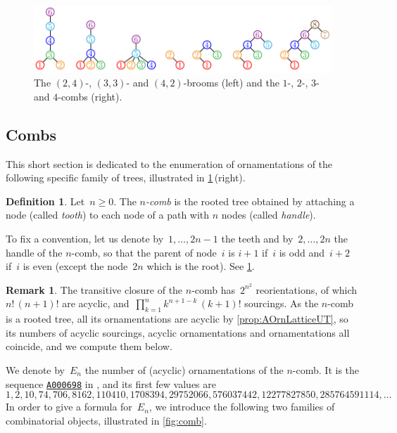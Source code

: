 \documentclass{amsart}
\theoremstyle{definition}
\newtheorem{definition}[theorem]{Definition}
\newtheorem{remark}[theorem]{Remark}
\newcommand{\darkblue}{\color{darkblue}} %
\newcommand{\defn}[1]{\textsl{\darkblue #1}} %
\newcommand{\OEIS}[1]{{\rm \href{http://oeis.org/#1}{\texttt{#1}}}}
\begin{document}
\begin{figure}
	\centerline{\includegraphics[scale=.8]{broomsCombs}}
	\caption{The $(2,4)$-, $(3,3)$- and $(4,2)$-brooms (left) and the $1$-, $2$-, $3$- and $4$-combs (right).}
	\label{fig:broomsCombs}
\end{figure}

\subsection{Combs}
\label{subsec:combs}

This short section is dedicated to the enumeration of ornamentations of the following specific family of trees, illustrated in \cref{fig:broomsCombs}\,(right).


\begin{definition}
Let~$n \ge 0$.
The \defn{$n$-comb} is the rooted tree obtained by attaching a node (called \defn{tooth}) to each node of a path with $n$ nodes (called \defn{handle}).
\end{definition}

To fix a convention, let us denote by~$1, \dots, 2n-1$ the teeth and by~$2, \dots, 2n$ the handle of the $n$-comb, so that the parent of node~$i$ is $i+1$ if~$i$ is odd and~$i+2$ if~$i$ is even (except the node~$2n$ which is the root).
See \cref{fig:broomsCombs}.

\begin{remark}
The transitive closure of the $n$-comb has~$2^{n^2}$ reorientations, of which $n! \, (n+1)!$ are acyclic, and~$\prod_{k = 1}^n k^{n+1-k} \, (k+1)!$ sourcings.
As the $n$-comb is a rooted tree, all its ornamentations are acyclic by \cref{prop:AOrnLatticeUT}, so its numbers of acyclic sourcings, acyclic ornamentations and ornamentations all coincide, and we compute them below.
\end{remark}

We denote by~$E_n$ the number of (acyclic) ornamentations of the $n$-comb.
It is the sequence \OEIS{A000698} in \cite{OEIS}, and its first few values are
\[
1, 2, 10, 74, 706, 8162, 110410, 1708394, 29752066, 576037442, 12277827850, 285764591114, \dots
\]
In order to give a formula for~$E_n$, we introduce the following two families of combinatorial objects, illustrated in \cref{fig:comb}.
\end{document}
